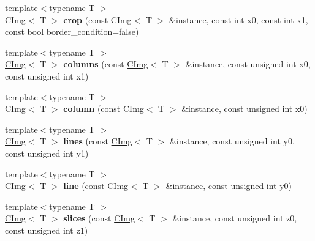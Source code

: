 \begin{DoxyCompactItemize}
\item 
\hypertarget{namespacecimg__library_a5095b444b5d8ae1488b2c112248ab3e9}{{\footnotesize template$<$typename T $>$ }\\\hyperlink{structcimg__library_1_1_c_img}{C\-Img}$<$ T $>$ {\bfseries crop} (const \hyperlink{structcimg__library_1_1_c_img}{C\-Img}$<$ T $>$ \&instance, const int x0, const int x1, const bool border\-\_\-condition=false)}\label{namespacecimg__library_a5095b444b5d8ae1488b2c112248ab3e9}

\item 
\hypertarget{namespacecimg__library_a516571be8b9d874cddff3883b1db8a5f}{{\footnotesize template$<$typename T $>$ }\\\hyperlink{structcimg__library_1_1_c_img}{C\-Img}$<$ T $>$ {\bfseries columns} (const \hyperlink{structcimg__library_1_1_c_img}{C\-Img}$<$ T $>$ \&instance, const unsigned int x0, const unsigned int x1)}\label{namespacecimg__library_a516571be8b9d874cddff3883b1db8a5f}

\item 
\hypertarget{namespacecimg__library_aefbcca8780ef3e219935864837a8eb55}{{\footnotesize template$<$typename T $>$ }\\\hyperlink{structcimg__library_1_1_c_img}{C\-Img}$<$ T $>$ {\bfseries column} (const \hyperlink{structcimg__library_1_1_c_img}{C\-Img}$<$ T $>$ \&instance, const unsigned int x0)}\label{namespacecimg__library_aefbcca8780ef3e219935864837a8eb55}

\item 
\hypertarget{namespacecimg__library_aa92df0e0a05ae69f275454c41264bd10}{{\footnotesize template$<$typename T $>$ }\\\hyperlink{structcimg__library_1_1_c_img}{C\-Img}$<$ T $>$ {\bfseries lines} (const \hyperlink{structcimg__library_1_1_c_img}{C\-Img}$<$ T $>$ \&instance, const unsigned int y0, const unsigned int y1)}\label{namespacecimg__library_aa92df0e0a05ae69f275454c41264bd10}

\item 
\hypertarget{namespacecimg__library_a75ea789f8c09aa76e6c793f74a5bc885}{{\footnotesize template$<$typename T $>$ }\\\hyperlink{structcimg__library_1_1_c_img}{C\-Img}$<$ T $>$ {\bfseries line} (const \hyperlink{structcimg__library_1_1_c_img}{C\-Img}$<$ T $>$ \&instance, const unsigned int y0)}\label{namespacecimg__library_a75ea789f8c09aa76e6c793f74a5bc885}

\item 
\hypertarget{namespacecimg__library_a72a6507099ebdefe1812334ba2e6850b}{{\footnotesize template$<$typename T $>$ }\\\hyperlink{structcimg__library_1_1_c_img}{C\-Img}$<$ T $>$ {\bfseries slices} (const \hyperlink{structcimg__library_1_1_c_img}{C\-Img}$<$ T $>$ \&instance, const unsigned int z0, const unsigned int z1)}\label{namespacecimg__library_a72a6507099ebdefe1812334ba2e6850b}


\end{DoxyCompactItemize}
